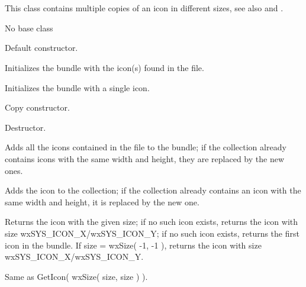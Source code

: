 \section{}\label{wxiconbundle}

This class contains multiple copies of an icon in different sizes,
see also  and
.


No base class


\label{wxiconbundlewxiconbundle}


Default constructor.


Initializes the bundle with the icon(s) found in the file.


Initializes the bundle with a single icon.


Copy constructor.

\label{wxiconbundledtor}


Destructor.

\label{wxiconbundleaddicon}


Adds all the icons contained in the file to the bundle;
if the collection already contains icons with the same
width and height, they are replaced by the new ones.


Adds the icon to the collection; if the collection already
contains an icon with the same width and height, it is
replaced by the new one.

\label{wxiconbundlegeticon}


Returns the icon with the given size; if no such icon exists,
returns the icon with size wxSYS\_ICON\_X/wxSYS\_ICON\_Y;
if no such icon exists,
returns the first icon in the bundle. If size = wxSize( -1, -1 ),
returns the icon with size wxSYS\_ICON\_X/wxSYS\_ICON\_Y.


Same as GetIcon( wxSize( size, size ) ).

\label{wxiconbundleoperatorassign}

